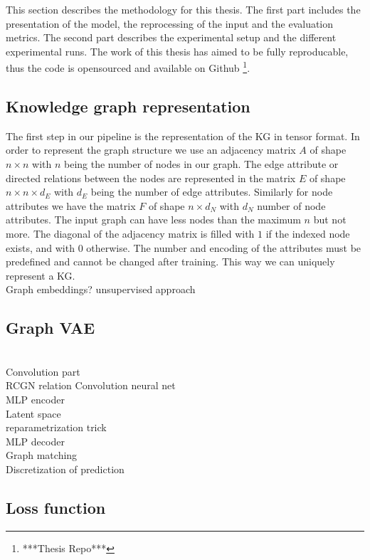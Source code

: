This section describes the methodology for this thesis. The first part includes the presentation of the model, the reprocessing of the input and the evaluation metrics. The second part describes the experimental setup and the different experimental runs. The work of this thesis has aimed to be fully reproducable, thus the code is opensourced and available on Github \footnote{***Thesis Repo***}.

\subsection{Knowledge graph representation}

The first step in our pipeline is the representation of the KG in tensor format. In order to represent the graph structure we use an adjacency matrix $A$ of shape $n\times n$ with $n$ being the number of nodes in our graph. The edge attribute or directed relations between the nodes are represented in the matrix $E$ of shape $n\times n\times d_E$ with $d_E$ being the number of edge attributes. Similarly for node attributes we have the matrix $F$ of shape $n\times d_N$ with $d_N$ number of node attributes. The input graph can have less nodes than the maximum $n$ but not more. The diagonal of the adjacency matrix is filled with $1$ if the indexed node exists, and with $0$ otherwise. The number and encoding of the attributes must be predefined and cannot be changed after training. This way we can uniquely represent a KG.\\


Graph embeddings? unsupervised approach

\subsection{Graph VAE}

\\Convolution part
\\RCGN relation Convolution neural net
\\MLP encoder
\\Latent space
\\reparametrization trick
\\MLP decoder
\\Graph matching
\\Discretization of prediction

\subsection{Loss function}

